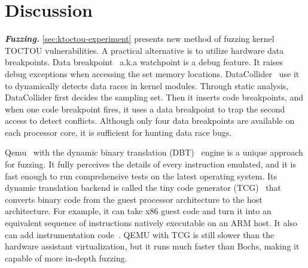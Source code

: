 
\section{Discussion}
\label{sec:ktoctou-discussion}


\textbf{\textit{Fuzzing.}} \autoref{sec:ktoctou-experiment} presents new method of fuzzing kernel TOCTOU vulnerabilities. A practical alternative is to utilize hardware data breakpoints. Data breakpoint~\cite{krishnan2009hardware} a.k.a watchpoint is a debug feature.  It raises debug exceptions when accessing the set memory locations.  DataCollider~\cite{krishnan2009hardware} use it to dynamically detects data races in kernel modules. Through static analysis,  DataCollider first decides the sampling set. Then it inserts code breakpoints, and when one code breakpoint fires, it uses a data breakpoint to trap the second access to detect conflicts. Although only four data breakpoints are available on each processor core, it is sufficient for hunting data race bugs.


Qemu~\cite{bellard2005qemu} with the dynamic binary translation (DBT)~\cite{ebcioglu2001dynamic} engine is a unique approach for fuzzing. It fully perceives the details of every instruction emulated, and it is fast enough to run comprehensive tests on the latest operating system. Its dynamic translation backend is called the tiny code generator (TCG)~\cite{bellard2009tiny} that converts binary code from the guest processor architecture to the host architecture. For example, it can take x86 guest code and turn it into an equivalent sequence of instructions natively executable on an ARM host. It also can add instrumentation code~\cite{quynh2015unicorn}. QEMU with TCG is still slower than the hardware assistant virtualization, but it runs much faster than Bochs, making it capable of more in-depth fuzzing.





